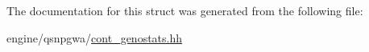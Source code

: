 The documentation for this struct was generated from the following file:\begin{DoxyCompactItemize}
\item 
engine/qsnpgwa/\hyperlink{cont__genostats_8hh}{cont\_\-genostats.hh}\end{DoxyCompactItemize}
